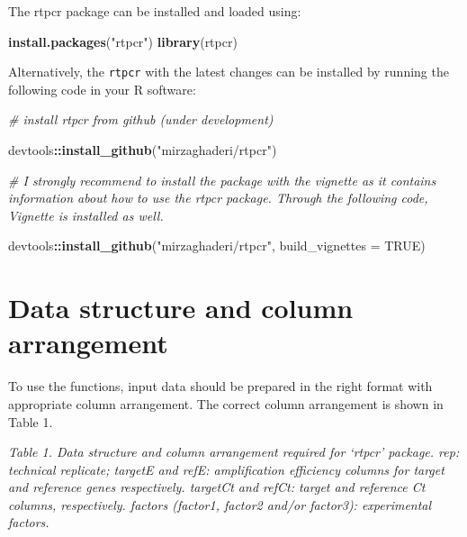 \documentclass[
]{article}
\newenvironment{Shaded}{\begin{snugshade}}{\end{snugshade}}
\newcommand{\AttributeTok}[1]{\textcolor[rgb]{0.13,0.29,0.53}{#1}}
\newcommand{\CommentTok}[1]{\textcolor[rgb]{0.56,0.35,0.01}{\textit{#1}}}
\newcommand{\ConstantTok}[1]{\textcolor[rgb]{0.56,0.35,0.01}{#1}}
\newcommand{\FunctionTok}[1]{\textcolor[rgb]{0.13,0.29,0.53}{\textbf{#1}}}
\newcommand{\NormalTok}[1]{#1}
\newcommand{\SpecialCharTok}[1]{\textcolor[rgb]{0.81,0.36,0.00}{\textbf{#1}}}
\newcommand{\StringTok}[1]{\textcolor[rgb]{0.31,0.60,0.02}{#1}}
\begin{document}
The rtpcr package can be installed and loaded using:

\begin{Shaded}
\begin{Highlighting}[]
\FunctionTok{install.packages}\NormalTok{(}\StringTok{"rtpcr"}\NormalTok{)}
\FunctionTok{library}\NormalTok{(rtpcr)}
\end{Highlighting}
\end{Shaded}

Alternatively, the \texttt{rtpcr} with the latest changes can be
installed by running the following code in your R software:

\begin{Shaded}
\begin{Highlighting}[]
\CommentTok{\# install \textasciigrave{}rtpcr\textasciigrave{} from github (under development)}

\NormalTok{devtools}\SpecialCharTok{::}\FunctionTok{install\_github}\NormalTok{(}\StringTok{"mirzaghaderi/rtpcr"}\NormalTok{)}

\CommentTok{\# I strongly recommend to install the package with the vignette as it contains information about how to use the \textquotesingle{}rtpcr\textquotesingle{} package. Through the following code, Vignette is installed as well.}

\NormalTok{devtools}\SpecialCharTok{::}\FunctionTok{install\_github}\NormalTok{(}\StringTok{"mirzaghaderi/rtpcr"}\NormalTok{, }\AttributeTok{build\_vignettes =} \ConstantTok{TRUE}\NormalTok{)}
\end{Highlighting}
\end{Shaded}

\hypertarget{data-structure-and-column-arrangement}{%
\section{Data structure and column
arrangement}\label{data-structure-and-column-arrangement}}

To use the functions, input data should be prepared in the right format
with appropriate column arrangement. The correct column arrangement is
shown in Table 1.

\emph{Table 1. Data structure and column arrangement required for
`rtpcr' package. rep: technical replicate; targetE and refE:
amplification efficiency columns for target and reference genes
respectively. targetCt and refCt: target and reference Ct columns,
respectively. factors (factor1, factor2 and/or factor3): experimental
factors.}
\end{document}
